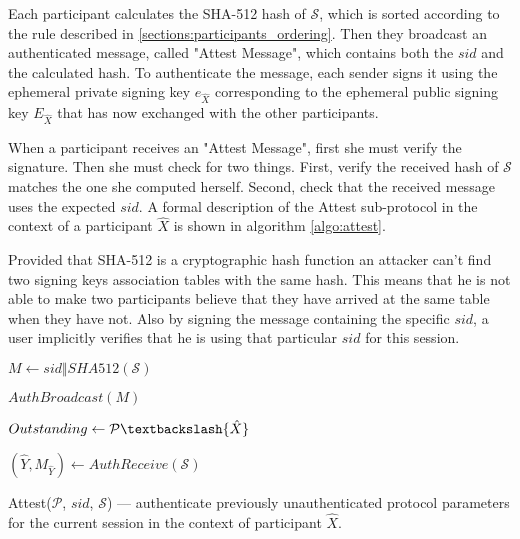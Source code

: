 Each participant calculates the SHA-512 hash of $\mathcal{S}$, which is sorted according to the rule described in \ref{sections:participants_ordering}. Then they broadcast an authenticated message, called "Attest Message", which contains both the $sid$ and the calculated hash. To authenticate the message, each sender signs it using the ephemeral private signing key $e_{\hat{X}}$ corresponding to the ephemeral public signing key $E_{\hat{X}}$ that has now exchanged with the other participants.

When a participant receives an "Attest Message", first she must verify the signature. Then she must check for two things. First, verify the received hash of $\mathcal{S}$ matches the one she computed herself. Second, check that the received message uses the expected $sid$. A formal description of the Attest sub-protocol in the context of a participant $\hat{X}$ is shown in algorithm \ref{algo:attest}.

Provided that SHA-512 is a cryptographic hash function an attacker can't find two signing keys association tables with the same hash. This means that he is not able to make two participants believe that they have arrived at the same table when they have not. Also by signing the message containing the specific $sid$, a user implicitly verifies that he is using that particular $sid$ for this session.

\begin{algorithm}[H]
  \Begin
  {	
	$M \leftarrow sid \Vert SHA512(\mathcal{S})$
	
	$AuthBroadcast(M)$
	
	$Outstanding \leftarrow \mathcal{P} \textbackslash \{\hat{X}\}$

    {
      $(\hat{Y}, M_{\hat{Y}}) \leftarrow AuthReceive(\mathcal{S})$
      
      {     
        
      }
    }

  }
  \caption{Attest($\mathcal{P}$, $sid$, $\mathcal{S}$) --- authenticate previously unauthenticated protocol parameters for the current session in the context of participant $\hat{X}$.}
  \label{algo:attest}
\end{algorithm}

